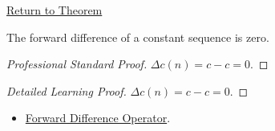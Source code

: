 \newpage
{}
\label{prf:delta-constant}

\begin{remark*}[Return]
\hyperref[prop:delta-constant]{Return to Theorem}
\end{remark*}

\begin{proposition*}
The forward difference of a constant sequence is zero.
\end{proposition*}

\begin{proof}[Professional Standard Proof]
\LRAProofBodyStart
\(\Delta c(n) = c - c = 0\).
\end{proof}

\begin{proof}[Detailed Learning Proof]
\LRAProofBodyStart
\(\Delta c(n) = c - c = 0\).
\end{proof}

\begin{remark*}
\end{remark*}

\begin{dependencies}
\begin{itemize}
  \item \hyperref[def:forward-difference]{Forward Difference Operator}.
\end{itemize}
\end{dependencies}
\clearpage
